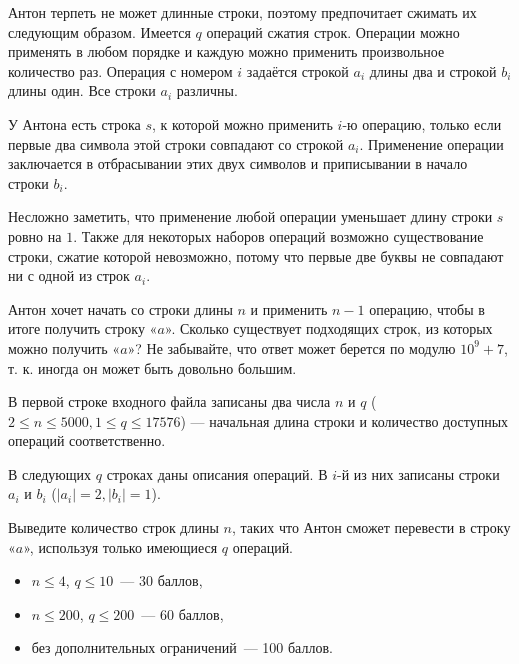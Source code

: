 
\Legend

Антон терпеть не может длинные строки, поэтому предпочитает сжимать их следующим образом. Имеется $q$ операций сжатия строк. Операции можно применять в любом порядке и каждую можно применить произвольное количество раз. Операция с номером $i$ задаётся строкой $a_i$ длины два и строкой $b_i$ длины один. Все строки $a_i$ различны.

У Антона есть строка $s$, к которой можно применить $i$-ю операцию, только если первые два символа этой строки совпадают со строкой $a_i$. Применение операции заключается в отбрасывании этих двух символов и приписывании в начало строки $b_i$.

Несложно заметить, что применение любой операции уменьшает длину строки $s$ ровно на $1$. Также для некоторых наборов операций возможно существование строки, сжатие которой невозможно, потому что первые две буквы не совпадают ни с одной из строк $a_i$.

Антон хочет начать со строки длины $n$ и применить $n - 1$ операцию, чтобы в итоге получить строку «$a$». Сколько существует подходящих строк, из которых можно получить «$a$»? Не забывайте, что ответ может берется по модулю $10^9 + 7$, т. к. иногда он может быть довольно большим.

\Input
В первой строке входного файла записаны два числа $n$ и $q$ ($2 \le n \le 5000, 1 \le q \le 17576$) — начальная длина строки и количество доступных операций соответственно.

В следующих $q$ строках даны описания операций. В $i$-й из них записаны строки $a_i$ и $b_i$ ($|a_i| = 2, |b_i| = 1$).

\Output
Выведите количество строк длины $n$, таких что Антон сможет перевести в строку «$a$», используя только имеющиеся $q$ операций.

\Samples
\BeginTests
\EndTests

\Scoring
\begin{itemize}
	\item $n \le 4$, $q \le 10$~--- 30 баллов,
	\item $n \le 200$, $q \le 200$~--- 60 баллов,
	\item без дополнительных ограничений~--- 100 баллов.
\end{itemize}

\EndProblem
